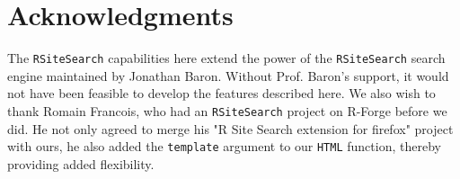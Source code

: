 \section*{Acknowledgments}
The {\tt RSiteSearch} capabilities here extend the power of the
{\tt RSiteSearch} search engine maintained by Jonathan Baron.
Without Prof. Baron's support, it would not have been feasible
to develop the features described here.  We also wish to thank 
Romain Francois, who had an {\tt RSiteSearch} project on R-Forge
before we did.  He not only agreed to merge his "R Site Search 
extension for firefox" project with ours, he also added the 
{\tt template} argument to our {\tt HTML} function, thereby 
providing added flexibility.  
